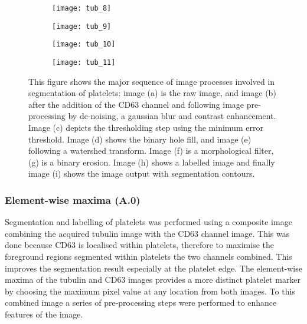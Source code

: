 \begin{figure}[htbp]
	\begin{subfigure}[b]{0.32\linewidth}
		\centering
		\texttt{[image: tub\_8]}
		\caption{}
		\label{figure:image_processing:platelet:tub_8}
		\vspace{1ex}
	\end{subfigure}
	\begin{subfigure}[b]{0.32\linewidth}
		\centering
		\texttt{[image: tub\_9]}
		\caption{}
		\label{figure:image_processing:platelet:tub_9}
		\vspace{1ex}
	\end{subfigure}
	\begin{subfigure}[b]{0.32\linewidth}
		\centering
		\texttt{[image: tub\_10]}
		\caption{}
		\label{figure:image_processing:platelet:tub_10}
		\vspace{1ex}
	\end{subfigure}
	\begin{subfigure}[b]{0.32\linewidth}
		\texttt{[image: tub\_11]}
		\caption{}
		\label{figure:image_processing:platelet:tub_11}
		\vspace{1ex}
	\end{subfigure}
\caption[Image processing for platelet segmentation]{This figure shows the  major sequence of image processes involved in segmentation of platelets: image (a) is the raw image, and image (b) after the addition of the CD63 channel and following image pre-processing by de-noising, a gaussian blur and contrast enhancement. Image (c) depicts the thresholding step using the minimum error threshold. Image (d) shows the binary hole fill, and image (e) following a watershed transform. Image (f) is a morphological filter, (g) is a binary erosion. Image (h) shows a labelled image and finally image (i) shows the image output with segmentation contours.}
\label{figure:image_processing:platelets}
\end{figure}

\subsubsection{Element-wise maxima (A.0)}
Segmentation and labelling of platelets was performed using a composite image combining the acquired tubulin image with the CD63 channel image. This was done because CD63 is localised within platelets, therefore to maximise the foreground regions segmented within platelets the two channels combined. This improves the segmentation result especially at the platelet edge. The element-wise maxima of the tubulin and CD63 images provides a more distinct platelet marker by choosing the maximum pixel value at any location from both images. To this combined image a series of pre-processing steps were performed to enhance features of the image.

